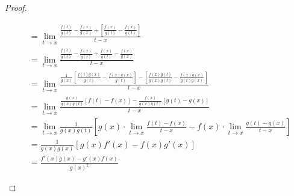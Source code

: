 \documentclass{article}
\theoremstyle{definition}
\begin{document}
\begin{proof}
\begin{enumerate}
\begin{align*}
		&=\lim\limits_{t\to x}\frac{\frac{f(t)}{g(t)}-\frac{f(x)}{g(x)}+\left[\frac{f(x)}{g(t)}-\frac{f(x)}{g(t)}\right]}{t-x}\\&=\lim\limits_{t\to x}\frac{\frac{f(t)}{g(t)}-\frac{f(x)}{g(t)}+\frac{f(x)}{g(t)}-\frac{f(x)}{g(x)}}{t-x}\\
		&=\lim\limits_{t\to x}\frac{\frac{1}{g(x)}\left[\frac{f(t)g(x)}{g(t)}-\frac{f(x)g(x)}{g(t)}\right]-\left[\frac{f(x)g(t)}{g(x)g(t)}-\frac{f(x)g(x)}{g(t)g(x)}\right]}{t-x}\\	&=\lim\limits_{t\to x}\frac{\frac{g(x)}{g(x)g(t)}\left[f(t)-f(x)\right]-\frac{f(x)}{g(x)g(t)}\left[g(t)-g(x)\right]}{t-x}\\
		&=\lim\limits_{t\to x}\frac{1}{g(x)g(t)}\left[g(x)\cdot\lim\limits_{t\to x}\frac{f(t)-f(x)}{t-x}-f(x)\cdot\lim\limits_{t\to x}\frac{g(t)-g(x)}{t-x}\right]\\&=\frac{1}{g(x)g(x)}[g(x)f'(x)-f(x)g'(x)]\\&=\frac{f'(x)g(x)-g'(x)f(x)}{g(x)^2}
	\end{align*}
	
\end{enumerate}
\end{proof}
\end{document}

